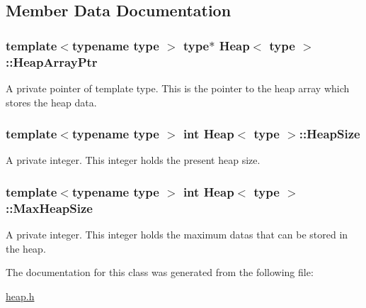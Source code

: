 \subsection{Member Data Documentation}
\hypertarget{classHeap_ac72ccab357597f7af528ff8fd2a1e407}{
\subsubsection[{HeapArrayPtr}]{\setlength{\rightskip}{0pt plus 5cm}template$<$typename type $>$ type$\ast$ {\bf Heap}$<$ type $>$::{\bf HeapArrayPtr}}}
\label{classHeap_ac72ccab357597f7af528ff8fd2a1e407}
A private pointer of template type. This is the pointer to the heap array which stores the heap data. \hypertarget{classHeap_a42943c5d99db91b35800324be31941f5}{
\subsubsection[{HeapSize}]{\setlength{\rightskip}{0pt plus 5cm}template$<$typename type $>$ int {\bf Heap}$<$ type $>$::{\bf HeapSize}}}
\label{classHeap_a42943c5d99db91b35800324be31941f5}
A private integer. This integer holds the present heap size. \hypertarget{classHeap_a9690145e2e3d0de97a8c4c79b704ec97}{
\subsubsection[{MaxHeapSize}]{\setlength{\rightskip}{0pt plus 5cm}template$<$typename type $>$ int {\bf Heap}$<$ type $>$::{\bf MaxHeapSize}}}
\label{classHeap_a9690145e2e3d0de97a8c4c79b704ec97}
A private integer. This integer holds the maximum datas that can be stored in the heap. 

The documentation for this class was generated from the following file:\begin{DoxyCompactItemize}
\item 
\hyperlink{heap_8h}{heap.h}\end{DoxyCompactItemize}
